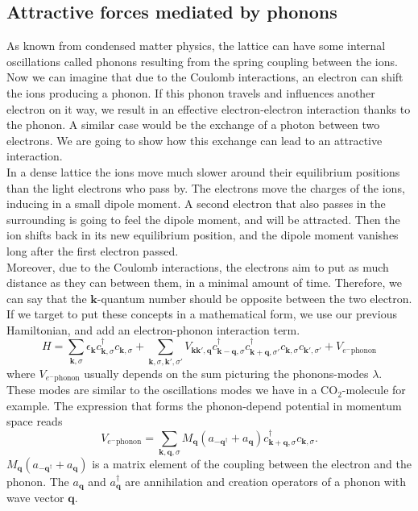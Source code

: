 \documentclass[../main.tex]{subfile}
\begin{document}
\subsection{Attractive forces mediated by phonons}
As known from condensed matter physics, the lattice can have some internal oscillations called phonons resulting from the spring coupling between the ions.
Now we can imagine that due to the Coulomb interactions, an electron can shift the ions producing a phonon. If this phonon travels and influences another electron
on it way, we result in an effective electron-electron interaction thanks to the phonon. A similar case would be the exchange of a photon between two electrons.
We are going to show how this exchange can lead to an attractive interaction.\\

In a dense lattice the ions move much slower around their equilibrium positions than the light electrons who pass by. The electrons move the charges of the ions, inducing
in a small dipole moment. A second electron that also passes in the surrounding is going to feel the dipole moment, and will be 
attracted. Then the ion shifts back in its new equilibrium position, and the dipole moment vanishes long after the first electron passed.\\

Moreover, due to the Coulomb interactions, the electrons aim to put as much distance as they can between them, in a minimal amount of time. Therefore,
we can say that the $\bm{k}$-quantum number should be opposite between the two electron. If we target to put these concepts in a mathematical form, we use
our previous Hamiltonian, and add an electron-phonon interaction term.
\[
    H = \sum_{\bm{k},\sigma} \epsilon_{\bm{k}} c_{\bm{k},\sigma}^{\dagger}c_{\bm{k},\sigma} + \sum_{\bm{k},\sigma,\bm{k}',\sigma'}
        V_{\bm{k}\bm{k}', \bm{q}} c_{\bm{k}-\bm{q},\sigma}^{\dagger}c_{\bm{k}+\bm{q},\sigma'}^{\dagger}c_{\bm{k},\sigma}c_{\bm{k}',\sigma'} + V_{e^-\text{phonon}}
\]
where $V_{e^-\text{phonon}}$ usually depends on the sum picturing the phonons-modes $\lambda$. These modes are similar to the oscillations modes we have in a CO$_2$-molecule for example.
The expression that forms the phonon-depend potential in momentum space reads 
\begin{equation} \label{eq:Pot_phonon_interaction}
    V_{e^-\text{phonon}} = \sum_{\bm{k},\bm{q},\sigma} M_{\bm{q}}\left(a_{-\bm{q}^{\dagger}} + a_{\bm{q}}\right) c_{\bm{k}+\bm{q},\sigma}^{\dagger}c_{\bm{k},\sigma}.
\end{equation}
$M_{\bm{q}}\left(a_{-\bm{q}^{\dagger}} + a_{\bm{q}}\right) $ is a matrix element of the coupling between the electron and the phonon. 
The $a_{\bm{q}}$ and $a_{\bm{q}}^{\dagger}$ are annihilation and creation operators of a phonon with wave vector $\bm{q}$.\\
\end{document}
